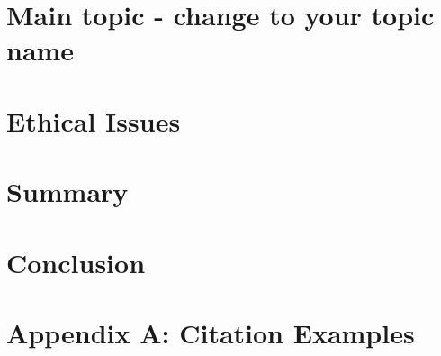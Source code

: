 \documentclass[conference]{IEEEtran}
\begin{document}
\section{Main topic - change to your topic name}


\section{Ethical Issues}


\section{Summary}


\section{Conclusion}


\section*{Appendix A:  Citation Examples}





\newcommand{\noroffcount}[1]{%
\immediate\write18{texcount -v0 -q -total  -sum -merge -q #1.tex > #1-words.noroff }%
}
%
%

\newcommand{\NUCwordcount}[1]{
    \section*{Word count metrics}
    \framebox{%
    \begin{minipage}{0.95\textwidth}
    \textbf{NUC Studio2 Word Count}:\\
    \noroffcount{#1}
    NOTE: References are excluded.
    \end{minipage}}
}

\newpage
\end{document}
